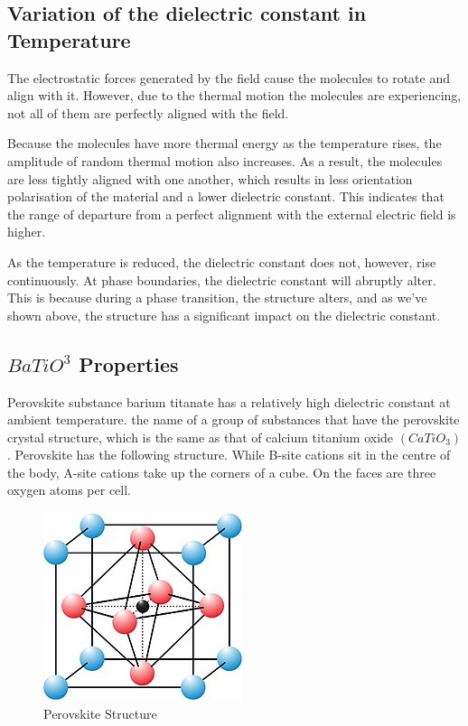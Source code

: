 	\subsection{Variation of the dielectric constant in Temperature}
		The electrostatic forces generated by the field cause the molecules to rotate and align with it. However, due to the thermal motion the molecules are experiencing, not all of them are perfectly aligned with the field.

		Because the molecules have more thermal energy as the temperature rises, the amplitude of random thermal motion also increases. As a result, the molecules are less tightly aligned with one another, which results in less orientation polarisation of the material and a lower dielectric constant. This indicates that the range of departure from a perfect alignment with the external electric field is higher.

		As the temperature is reduced, the dielectric constant does not, however, rise continuously. At phase boundaries, the dielectric constant will abruptly alter. This is because during a phase transition, the structure alters, and as we've shown above, the structure has a significant impact on the dielectric constant.


	\subsection{$BaTiO^3$ Properties}

		Perovskite substance barium titanate has a relatively high dielectric constant at ambient temperature. the name of a group of substances that have the perovskite crystal structure, which is the same as that of calcium titanium oxide $(CaTiO_3)$. Perovskite has the following structure. While B-site cations sit in the centre of the body, A-site cations take up the corners of a cube. On the faces are three oxygen atoms per cell.

		\begin{figure}[H]
			\centering
			\label{fig:2}
			\includegraphics[width=0.4\columnwidth]{images/t3.jpg}
			\caption{Perovskite Structure}
		\end{figure}

